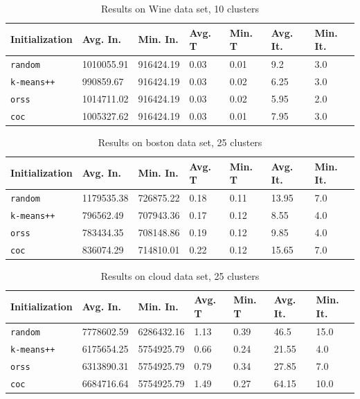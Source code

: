 \documentclass[12pt]{article}
\begin{document}
		\begin{table}[p]
			\begin{center}
				\begin{tabular}{|l|l|l|l|l|l|l|}
					\hline
					Initialization & Avg. In. & Min. In. & Avg. T & Min. T & Avg. It. & Min. It.\\\hline
					\texttt{random} & 1010055.91 & 916424.19 & 0.03 & 0.01 & 9.2 & 3.0\\\hline
					\texttt{k-means++} & 990859.67 & 916424.19 & 0.03 & 0.02 & 6.25 & 3.0\\\hline
					\texttt{orss} & 1014711.02 & 916424.19 & 0.03 & 0.02 & 5.95 & 2.0\\\hline
					\texttt{coc} & 1005327.62 & 916424.19 & 0.03 & 0.01 & 7.95 & 3.0\\\hline
				\end{tabular}
				\caption{Results on Wine data set, 10 clusters}
				\label{tbl:Wine10}
			\end{center}
		\end{table}

		\begin{table}[p]
			\begin{center}
				\begin{tabular}{|l|l|l|l|l|l|l|}
					\hline
					Initialization & Avg. In. & Min. In. & Avg. T & Min. T & Avg. It. & Min. It.\\\hline
					\texttt{random} & 1179535.38 & 726875.22 & 0.18 & 0.11 & 13.95 & 7.0\\\hline
					\texttt{k-means++} & 796562.49 & 707943.36 & 0.17 & 0.12 & 8.55 & 4.0\\\hline
					\texttt{orss} & 783434.35 & 708148.86 & 0.19 & 0.12 & 9.85 & 4.0\\\hline
					\texttt{coc} & 836074.29 & 714810.01 & 0.22 & 0.12 & 15.65 & 7.0\\\hline
				\end{tabular}
				\caption{Results on boston data set, 25 clusters}
				\label{tbl:boston25}
			\end{center}
		\end{table}

		\begin{table}[p]
			\begin{center}
				\begin{tabular}{|l|l|l|l|l|l|l|}
					\hline
					Initialization & Avg. In. & Min. In. & Avg. T & Min. T & Avg. It. & Min. It.\\\hline
					\texttt{random} & 7778602.59 & 6286432.16 & 1.13 & 0.39 & 46.5 & 15.0\\\hline
					\texttt{k-means++} & 6175654.25 & 5754925.79 & 0.66 & 0.24 & 21.55 & 4.0\\\hline
					\texttt{orss} & 6313890.31 & 5754925.79 & 0.79 & 0.34 & 27.85 & 7.0\\\hline
					\texttt{coc} & 6684716.64 & 5754925.79 & 1.49 & 0.27 & 64.15 & 10.0\\\hline
				\end{tabular}
				\caption{Results on cloud data set, 25 clusters}
				\label{tbl:cloud25}
			\end{center}
		\end{table}
\end{document}
